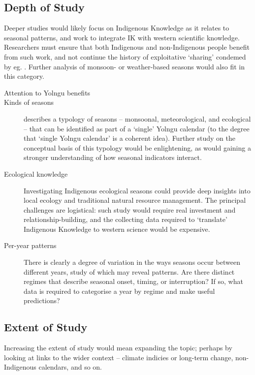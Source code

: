\subsection{Depth of Study}
Deeper studies would likely focus on Indigenous Knowledge as it
relates to seasonal patterns, and work to integrate IK with western scientific
knowledge.  Researchers must ensure that both Indigenous and non-Indigenous
people benefit from such work, and not continue the history of exploitative
`sharing' condemed by eg. \citet{smith1999}.  Further analysis of monsoon-
or weather-based seasons would also fit in this category.

\begin{description}
\item[Attention to Yolngu benefits]

\item[Kinds of seasons]
     describes a typology of seasons -- monsoonal,
    meteorological, and ecological -- that can be identified as part of a
    `single' Yolngu calendar (to the degree that `single Yolngu calendar'
    is a coherent idea).  Further study on the conceptual basis of this typology would
    be enlightening, as would gaining a stronger understanding of how
    seasonal indicators interact.

\item[Ecological knowledge]
    Investigating Indigenous ecological seasons could provide deep insights
    into local ecology and traditional natural resource management. The
    principal challenges are logistical:  such study would require real
    investment and relationship-building, and the collecting data
    required to `translate' Indigenous Knowledge to western science would
    be expensive.

\item[Per-year patterns]
    There is clearly a degree of variation in the ways seasons occur between
    different years, study of which may reveal patterns.  Are there distinct
    regimes that describe seasonal onset, timing, or interruption?  If so, what
    data is required to categorise a year by regime and make useful predictions?
\end{description}

\subsection{Extent of Study}
Increasing the extent of study would mean expanding the topic; perhaps by
looking at links to the wider context -- climate indicies or long-term
change, non-Indigenous calendars, and so on.


